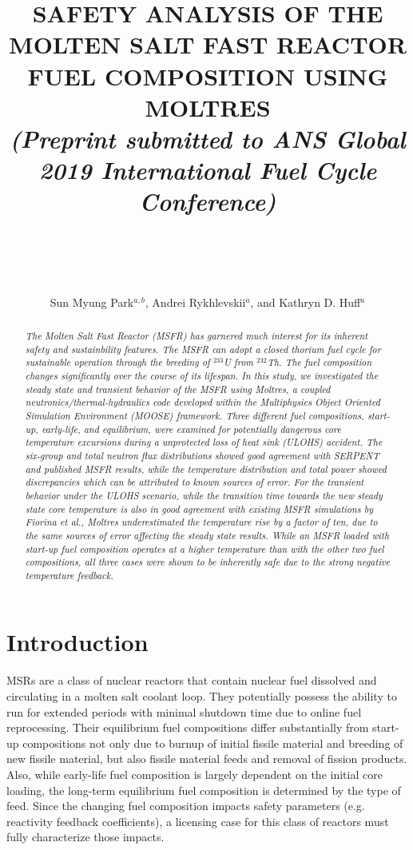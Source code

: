 \documentclass{anstrans}
\title{SAFETY ANALYSIS OF THE MOLTEN SALT FAST REACTOR FUEL COMPOSITION USING
MOLTRES \\ \textit{(Preprint submitted to ANS Global 2019 International Fuel
Cycle Conference)} \\~\\~\\}
\author{Sun Myung Park$^{a,b}$, Andrei Rykhlevskii$^a$, and
Kathryn D. Huff$^a$}
\institute{$^a$Dept. of Nuclear, Plasma and Radiological Engineering,
University of Illinois at Urbana-Champaign}
\begin{document}
\begin{abstract}
%
\textit{
    The Molten
    Salt Fast Reactor (MSFR) has garnered much interest for its inherent
    safety and sustainbility features. The MSFR can adopt a closed thorium fuel
    cycle for
    sustainable operation through the breeding of $^{233}$U from $^{232}$Th.
    The fuel composition changes significantly over the course of its lifespan.
    In this study, we investigated the steady state and transient behavior of
    the MSFR using Moltres, a coupled neutronics/thermal-hydraulics code
    developed within the Multiphysics Object Oriented Simulation Environment
    (MOOSE) framework. Three different fuel compositions, start-up,
    early-life, and equilibrium, were examined for potentially
    dangerous
    core temperature excursions during a unprotected loss of heat sink (ULOHS)
    accident. The six-group and total neutron flux distributions 
    showed good agreement with SERPENT and
    published MSFR results, while the temperature distribution and total power
    showed discrepancies which can be attributed to known sources of error.
    For the transient behavior under the ULOHS
    scenario, while the transition time towards the new steady state core
    temperature is also in good agreement with existing MSFR simulations by
    Fiorina et al., Moltres underestimated the
    temperature rise by a factor of ten, due to the same sources of
    error affecting the steady state results. While an MSFR loaded with
    start-up fuel composition operates at a higher temperature than with the
    other two fuel compositions, all three cases were shown to be inherently
    safe due to the strong negative temperature feedback.
}
\end{abstract}

\section{Introduction}

	\glspl{MSR} are a class of nuclear reactors that
	contain nuclear fuel dissolved and circulating in a molten salt coolant
	loop.
	They potentially possess the ability to run for extended 
    periods with minimal shutdown time due to online fuel reprocessing.
    Their equilibrium fuel compositions differ substantially from
    start-up compositions not only due to burnup of initial fissile material
    and breeding of new fissile material, but also fissile material feeds and 
    removal of fission products. Also, while early-life fuel composition is
    largely dependent on the initial core loading, the long-term equilibrium
    fuel composition is determined by the type of feed.
    Since the changing fuel composition 
    impacts safety parameters (e.g. reactivity feedback coefficients), a 
    licensing case for this class of reactors  must fully characterize 
    those impacts.
\end{document}
